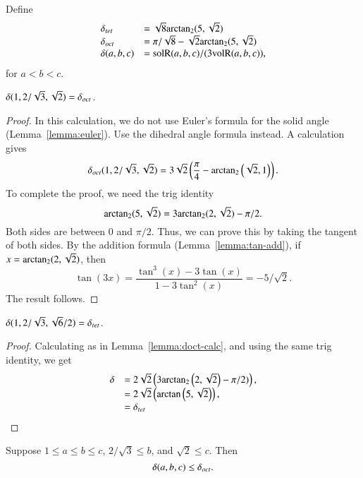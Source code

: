 \begin{definition}  Define 
  $$
  \begin{array}{lll}
  \delta_{tet} &= \sqrt8 {\operatorname{arctan_2}}(5,\sqrt2)\\
  \delta_{oct} &= \pi/\sqrt8 - \sqrt2 {\operatorname{arctan_2}}(5,\sqrt2)\\
  \delta(a,b,c)&= {\operatorname{solR}}(a,b,c)/(3{\operatorname{volR}}(a,b,c)),
  \end{array}
  $$
for $a<b<c$.  
\end{definition}

\begin{lemma}
  $\delta(1,2/\sqrt{3},\sqrt2)=\delta_{oct}$.
\end{lemma}

\begin{proof}  In this calculation, we do not use Euler's formula
for the solid angle (Lemma~\ref{lemma:euler}).  
Use the dihedral angle formula instead.
A calculation gives
  $$
  \delta_{oct}(1,2/\sqrt{3},\sqrt2)=
  3 \sqrt{2} \left(\frac{\pi }{4}-{\operatorname{arctan_2}}
   \left({\sqrt{2}},{1}\right)\right).$$
To complete the proof, we need the trig identity
  $${\operatorname{arctan_2}}(5,\sqrt2)  = 3{\operatorname{arctan_2}}(2,\sqrt2)-\pi/2.$$
Both sides are between $0$ and $\pi/2$.  Thus, we can prove this
by taking the tangent of both sides. By the addition formula
(Lemma~\ref{lemma:tan-add}),
if $x={\operatorname{arctan_2}}(2,\sqrt2)$, then
   $$\tan(3 x) = \frac{\tan^3(x) - 3\tan(x)}{1-3 \tan^2(x)} = -5/\sqrt2.$$
The result follows.
\end{proof}

\begin{lemma}
  $\delta(1,2/\sqrt3,\sqrt6/2)=\delta_{tet}$.
\end{lemma}

\begin{proof} Calculating as in Lemma~\ref{lemma:doct-calc}, and using
the same trig identity, we get
$$\begin{array}{lll}
  \delta &=
2\sqrt{2} \left(3{\operatorname{arctan_2}}\left(2,\sqrt2\right) - \pi/2)\right),\\
  &=2\sqrt{2}\left(\arctan\left(5,\sqrt2\right)\right),\\
  &=\delta_{tet}
\end{array}
$$
\end{proof}

\begin{lemma}
Suppose $1\le a\le  b\le c$,  $2/\sqrt{3}\le b$, and $\sqrt2\le c$.  Then
$$
\delta(a,b,c) \le \delta_{oct}.
$$
\end{lemma}


